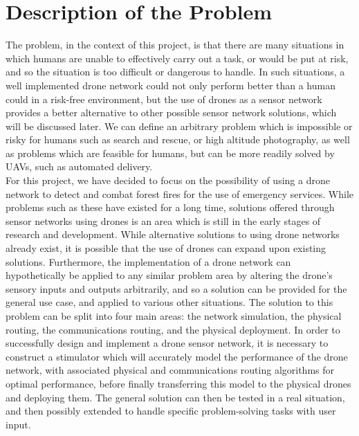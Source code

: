 	\section{Description of the Problem}
	The problem, in the context of this project, is that there are many situations in which humans are unable to effectively carry out a task, or would be put at risk, and so the situation is too difficult or dangerous to handle. In such situations, a well implemented drone network could not only perform better than a human could in a risk-free environment, but the use of drones as a sensor network provides a better alternative to other possible sensor network solutions, which will be discussed later. We can define an arbitrary problem which is impossible or risky for humans such as search and rescue, or high altitude photography, as well as problems which are feasible for humans, but can be more readily solved by UAVs, such as automated delivery. \\
	For this project, we have decided to focus on the possibility of using a drone network to detect and combat forest fires for the use of emergency services. While problems such as these have existed for a long time, solutions offered through sensor networks using drones is an area which is still in the early stages of research and development. While alternative solutions to using drone networks already exist, it is possible that the use of drones can expand upon existing solutions. Furthermore, the implementation of a drone network can hypothetically be applied to any similar problem area by altering the drone’s sensory inputs and outputs arbitrarily, and so a solution can be provided for the general use case, and applied to various other situations.
The solution to this problem can be split into four main areas: the network simulation, the physical routing, the communications routing, and the physical deployment. In order to successfully design and implement a drone sensor network, it is necessary to construct a stimulator which will accurately model the performance of the drone network, with associated physical and communications routing algorithms for optimal performance, before finally transferring this model to the physical drones and deploying them. The general solution can then be tested in a real situation, and then possibly extended to handle specific problem-solving tasks with user input. 
